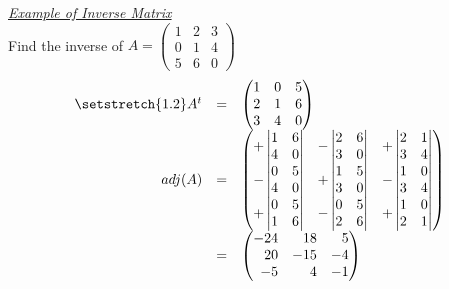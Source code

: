\documentclass[11pt,a4paper]{article}
\begin{document}
\newpage\textit{\underline{\textit{Example of Inverse Matrix}}}\\
Find the inverse of $A = \begin{pmatrix} 1 & 2 & 3 \\ 0 & 1 & 4 \\ 5 & 6 & 0 \end{pmatrix}$
\[\begin{array}{rcl}\setstretch{1.2}
  A^t &=& \begin{pmatrix} 1 & 0 & 5 \\ 2 & 1 & 6 \\ 3 & 4 & 0 \end{pmatrix}\\
  adj(A) &=& \begin{pmatrix} +\begin{vmatrix} 1 & 6 \\ 4 & 0\end{vmatrix} & -\begin{vmatrix}2 & 6 \\ 3 & 0 \end{vmatrix} & +\begin{vmatrix}2 & 1 \\ 3 & 4 \end{vmatrix} \\ -\begin{vmatrix} 0 & 5 \\ 4 & 0\end{vmatrix} & +\begin{vmatrix}1 & 5 \\ 3 & 0 \end{vmatrix} & -\begin{vmatrix}1 & 0 \\ 3 & 4 \end{vmatrix} \\ +\begin{vmatrix} 0 & 5 \\ 1 & 6\end{vmatrix} & -\begin{vmatrix} 0 & 5 \\ 2 & 6 \end{vmatrix} & +\begin{vmatrix}1 & 0 \\ 2 & 1 \end{vmatrix} \end{pmatrix}\\
  &=& \begin{pmatrix*}[r] -24 & 18 & 5 \\ 20 & -15 & -4 \\ -5 & 4 & -1 \end{pmatrix*}\\

\end{array}\]
\end{document}
